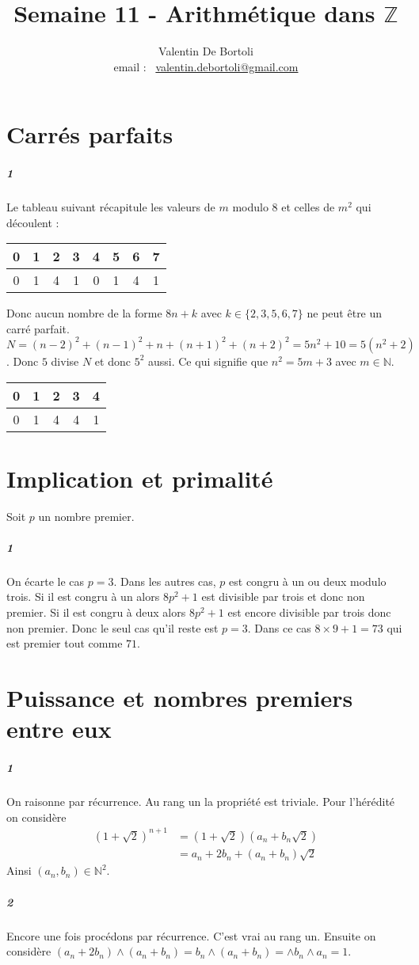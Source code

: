 \documentclass[10pt,a4paper]{article}
\title{Semaine 11 - Arithmétique dans $\mathbb{Z}$}
\author{Valentin De Bortoli \\ email : \ \href{mailto:valentin.debortoli@gmail.com}{valentin.debortoli@gmail.com}}
\date{}
\newcommand{\al}[1]{\begin{aligned} #1 \end{aligned}}
\begin{document}
\maketitle
\section{Carrés parfaits}
\subparagraph{1}Le tableau suivant récapitule les valeurs de $m$ modulo $8$ et celles de $m^2$ qui découlent :
\begin{tabular}{|c|c|c|c|c|c|c|c|}
\hline
0 & 1 & 2 & 3 & 4 & 5 & 6 & 7 \\
\hline
0 & 1 & 4 & 1 & 0 & 1 & 4 & 1 \\ \hline
\end{tabular}
Donc aucun nombre de la forme $8n + k$ avec $k \in \lbrace 2,3,5,6,7 \rbrace$ ne peut être un carré parfait.
$N = (n-2)^2 + (n-1)^2 + n + (n+1)^2 + (n+2)^2 = 5n^2 + 10 = 5(n^2+2)$. Donc $5$ divise $N$ et donc $5^2$ aussi. Ce qui signifie que $n^2 = 5m +3$ avec $m \in \mathbb{N}$.
\begin{tabular}{|c|c|c|c|c|}
\hline
0 & 1 & 2 & 3 & 4 \\
\hline
0 & 1 & 4 & 4 & 1 \\ \hline
\end{tabular}
\section{Implication et primalité}
Soit $p$ un nombre premier.
\subparagraph{1}On écarte le cas $p=3$. Dans les autres cas, $p$ est congru à un ou deux modulo trois. Si il est congru à un alors $8p^2+1$ est divisible par trois et donc non premier. Si il est congru à deux alors $8p^2+1$ est encore divisible par trois donc non premier. Donc le seul cas qu'il reste est $p=3$. Dans ce cas $8\times 9 +1 = 73$ qui est premier tout comme $71$.
\section{Puissance et nombres premiers entre eux}
\subparagraph{1}On raisonne par récurrence. Au rang un la propriété est triviale.
Pour l'hérédité on considère 
\[
\al{
(1+\sqrt{2})^{n+1} &= (1+ \sqrt{2})(a_n +b_n\sqrt{2}) \\
&= a_n + 2b_n + (a_n + b_n)\sqrt{2}
}
\]
Ainsi $(a_n,b_n) \in \mathbb{N}^2$.
\subparagraph{2}Encore une fois procédons par récurrence. C'est vrai au rang un.
Ensuite on considère $(a_n+2b_n) \wedge (a_n+ b_n) = b_n \wedge (a_n+b_n) = \wedge b_n \wedge a_n = 1$.
\end{document}

